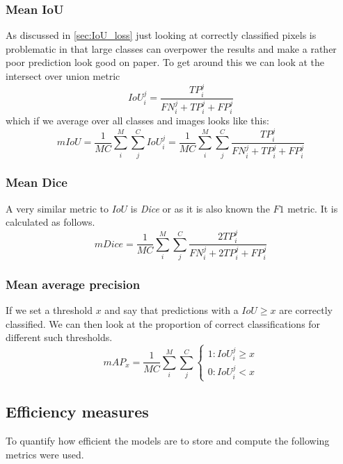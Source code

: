 \documentclass{kththesis}
\begin{document}
\subsubsection{Mean IoU}
As discussed in \cref{sec:IoU_loss} just looking at correctly classified pixels
is problematic in that large classes can overpower the results and make a rather
poor prediction look good on paper. To get around this we can look at the
intersect over union metric
\[IoU^j_i= \frac{\textit{TP}_i^j}{\textit{FN}_i^j + \textit{TP}_i^j + \textit{FP}_i^j}\]
which if we average over all classes and images looks like this:
\[\textit{m}IoU = \frac{1}{MC}\sum^M_i\sum^C_j IoU^j_i =\frac{1}{MC}\sum^M_i\sum^C_j\frac{\textit{TP}_i^j}{\textit{FN}_i^j +
    \textit{TP}_i^j + \textit{FP}_i^j}\]

\subsubsection{Mean Dice}
A very similar metric to \(IoU\) is \textit{Dice} or as it is also known the
\(F1\) metric. It is calculated as follows.
\[\textit{mDice} = \frac{1}{MC}\sum^M_i\sum^C_j\frac{2\textit{TP}_i^j}{\textit{FN}_i^j +
    2\textit{TP}_i^j + \textit{FP}_i^j}\]

\subsubsection{Mean average precision}
If we set a threshold \(x\) and say that predictions with a \(IoU \geq x\) are
correctly classified. We can then look at the proportion of correct
classifications for different such thresholds.
\[
  mAP_x = \frac{1}{MC}\sum^M_i\sum^C_j
    \begin{cases}
      1: IoU_i^j \geq x\\
      0: IoU_ i^j < x
   \end{cases}
\]


\subsection{Efficiency measures}
To quantify how efficient the models are to store and compute the following
metrics were used.
\end{document}
